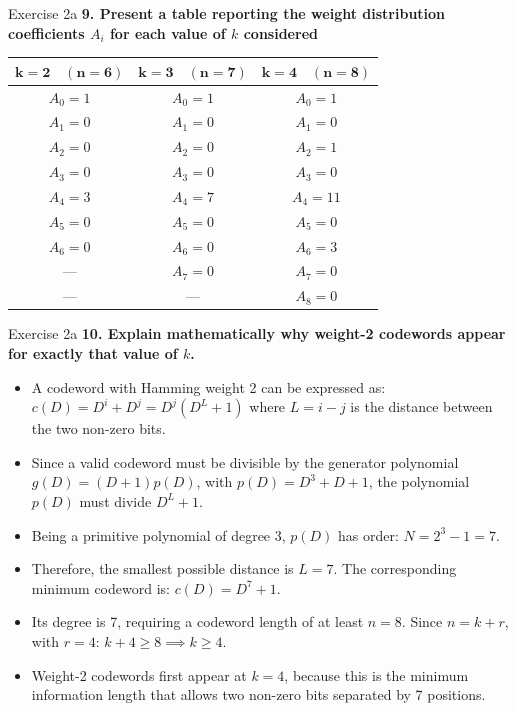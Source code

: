 \documentclass[10pt, aspectratio=169]{beamer}
\newcommand{\question}[1]{{\color{QuestionRed}\textbf{#1}}}
\begin{document}
\begin{frame}{Exercise 2a}
  \question{9. Present a table reporting the weight distribution coefficients $A_i$ for each value of $k$ considered}

  \vspace{0.25cm}
  \centering
  \small
  \renewcommand{\arraystretch}{0.92}
  \begin{tabular}{ccc}
    \toprule
    $\mathbf{k = 2 \quad (n = 6)}$ & $\mathbf{k = 3 \quad (n = 7)}$ & $\mathbf{k = 4 \quad (n = 8)}$ \\
    \midrule
    $A_0 = 1$ & $A_0 = 1$ & $A_0 = 1$ \\
    $A_1 = 0$ & $A_1 = 0$ & $A_1 = 0$ \\
    $A_2 = 0$ & $A_2 = 0$ & $A_2 = 1$ \\
    $A_3 = 0$ & $A_3 = 0$ & $A_3 = 0$ \\
    $A_4 = 3$ & $A_4 = 7$ & $A_4 = 11$ \\
    $A_5 = 0$ & $A_5 = 0$ & $A_5 = 0$ \\
    $A_6 = 0$ & $A_6 = 0$ & $A_6 = 3$ \\
    --- & $A_7 = 0$ & $A_7 = 0$ \\
    --- & --- & $A_8 = 0$ \\
    \bottomrule
  \end{tabular}
\end{frame}

\begin{frame}{Exercise 2a}
  \question{10. Explain mathematically why weight-2 codewords appear for exactly that value of $k$.}

  \vspace{0.15cm}
  \small
  \begin{itemize}
    \item A codeword with Hamming weight 2 can be expressed as: $c(D) = D^i + D^j = D^j(D^L + 1)$ where $L = i - j$ is the distance between the two non-zero bits.
    \item Since a valid codeword must be divisible by the generator polynomial $g(D) = (D+1)p(D)$, with $p(D) = D^3 + D + 1$, the polynomial $p(D)$ must divide $D^L + 1$.
    \item Being a primitive polynomial of degree 3, $p(D)$ has order: $N = 2^3 - 1 = 7$.
    \item Therefore, the smallest possible distance is $L = 7$. The corresponding minimum codeword is: $c(D) = D^7 + 1$.
    \item Its degree is 7, requiring a codeword length of at least $n = 8$. Since $n = k + r$, with $r = 4$: $k + 4 \ge 8 \implies k \ge 4$.
    \item Weight-2 codewords first appear at $k = 4$, because this is the minimum information length that allows two non-zero bits separated by 7 positions.
  \end{itemize}
\end{frame}
\end{document}
